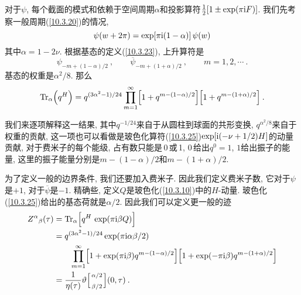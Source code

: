 对于$ \psi$, 每个截面的模式和依赖于空间周期$ \alpha $和投影算符$ \frac{1}{2}[1\pm\exp(\pi\mathrm{i} F)]$. 我们先考察一般周期(\ref{10.3.20})的情况,
\begin{equation}
    \psi(w+2\pi) =\exp[\pi\mathrm{i}(1-\alpha)]\,\psi(w) \label{10.7.4}
\end{equation}
其中$ \alpha=1-2\nu$. 根据基态的定义(\ref{10.3.23}), 上升算符是
\begin{equation}
    \psi_{-m+(1-\alpha)/2}\:,\qquad \overline{\psi}_{-m+(1+\alpha)/2}\:,   \qquad m=1,2,\cdots \:.\label{10.7.5}
\end{equation}
基态的权重是$ \alpha^{2}/8$. 那么
\begin{equation}
    \operatorname{Tr}_{\alpha}\Bigl(q^{H}\Bigr) = q^{(3\alpha^{2}-1)/24}\prod_{m=1}^{\infty}\Bigl[1+q^{m-(1-\alpha)/2}\Bigr]
    \Bigl[1+q^{m-(1+\alpha)/2}\Bigr]\:.\label{10.7.6}
\end{equation}
\begin{tcolorbox}
\noindent 我们来逐项解释这一结果, 其中$ q^{-1/24} $来自于从圆柱到球面的共形变换, $q^{\alpha^{2}/8} $来自于权重的贡献, 这一项也可以看做是玻色化算符(\ref{10.3.25})$ \exp[\mathrm{i}(-\nu+1/2)H] $的动量贡献, 对于费米子的每个能级, 占有数只能是\,0\,或\,1, 0\,给出$ q^{0}=1$, $1 $给出振子的能量, 这里的振子能量分别是$ m-(1-\alpha)/2 $和$ m-(1+\alpha)/2$.
\end{tcolorbox}
\noindent 为了定义一般的边界条件, 我们还要加入费米子. 因此我们定义费米子数, 它对于$ \psi $是$ +1$, 对于$ \overline{\psi} $是$ -1$. 精确些, 定义$ Q $是玻色化(\ref{10.3.10})中的$ H $-动量. 玻色化(\ref{10.3.25})给出的基态荷就是$ \alpha/2$. 因此我们可以定义更一般的迹
\begin{subequations} \label{10.7.7}
    \begin{align}
        Z^{\alpha}{}_{\beta}(\tau) &= \operatorname{Tr}_{\alpha}\Bigl[q^{H}\,\exp(\pi\mi \beta Q)\Bigr]\label{10.7.7a} \\
        &= q^{(3\alpha^{2}-1)/24}\exp(\pi\mi\alpha\beta/2) \nonumber \\
        &\qquad \prod_{m=1}^{\infty}\Bigl[1+\exp(\pi\mi\beta)q^{m-(1-\alpha)/2}\Bigr]\Bigl[1+\exp(-\pi\mi\beta)q^{m-(1+\alpha)/2}\Bigr]\label{10.7.7b} \\
        & =\frac{1}{\eta(\tau)}\vartheta \Bigl[
            \genfrac{}{}{0pt}{}{\scriptstyle \alpha/2}{\scriptstyle  \beta/2}
        \Bigr](0,\tau) \:.  \label{10.7.7c}
    \end{align} 
\end{subequations}


